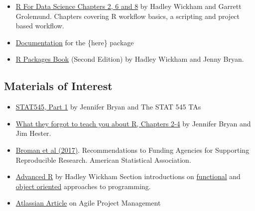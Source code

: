 \documentclass[
  12pt,
]{book}
\providecommand{\tightlist}{%
  \setlength{\itemsep}{0pt}\setlength{\parskip}{0pt}}
\begin{document}
\begin{itemize}
\item
  \href{https://r4ds.had.co.nz/index.html}{R For Data Science Chapters 2, 6 and 8} by Hadley Wickham and Garrett Grolemund. Chapters covering R workflow basics, a scripting and project based workflow.
\item
  \href{https://here.r-lib.org/articles/here.html}{Documentation} for the \{here\} package
\item
  \href{https://r-pkgs.org/}{R Packages Book} (Second Edition) by Hadley Wickham and Jenny Bryan.
\end{itemize}

\hypertarget{materials-of-interest}{%
\subsection*{Materials of Interest}\label{materials-of-interest}}

\begin{itemize}
\tightlist
\item
  \href{https://stat545.com/index.html}{STAT545, Part 1} by Jennifer Bryan and The STAT 545 TAs
\end{itemize}

\begin{itemize}
\tightlist
\item
  \href{https://rstats.wtf/}{What they forgot to teach you about R, Chapters 2-4} by Jennifer Bryan and Jim Hester.
\end{itemize}

\begin{itemize}
\tightlist
\item
  \href{https://www.amstat.org/docs/default-source/amstat-documents/pol-reproducibleresearchrecommendations.pdf}{Broman et al (2017)}. Recommendations to Funding Agencies for Supporting Reproducible Research. American Statistical Association.
\end{itemize}

\begin{itemize}
\item
  \href{https://adv-r.hadley.nz/}{Advanced R} by Hadley Wickham Section introductions on \href{https://adv-r.hadley.nz/fp.html}{functional} and \href{https://adv-r.hadley.nz/oo.html}{object oriented} approaches to programming.
\item
  \href{https://www.atlassian.com/agile/project-management}{Atlassian Article} on Agile Project Management
\end{itemize}
\end{document}
